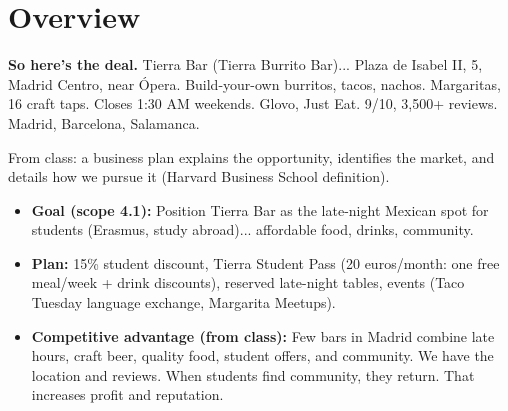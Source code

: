 \documentclass[11pt,a4paper]{article}
\begin{document}
\thispagestyle{empty}
\vspace*{2cm}
\noindent
{}
\vfill
{}
\newpage
\pagestyle{fancy}
\setcounter{page}{1}

\section{Overview}\label{sec:overview}

\textbf{So here's the deal.} Tierra Bar (Tierra Burrito Bar)... Plaza de Isabel II, 5, Madrid Centro, near \'Opera. Build-your-own burritos, tacos, nachos. Margaritas, 16 craft taps. Closes 1:30 AM weekends. Glovo, Just Eat. 9/10, 3,500+ reviews. Madrid, Barcelona, Salamanca.

From class: a business plan explains the opportunity, identifies the market, and details how we pursue it (Harvard Business School definition).

\begin{itemize}[leftmargin=*,nosep]
\item \textbf{Goal (scope 4.1):} Position Tierra Bar as the late-night Mexican spot for students (Erasmus, study abroad)... affordable food, drinks, community.
\item \textbf{Plan:} 15\% student discount, Tierra Student Pass (20 euros/month: one free meal/week + drink discounts), reserved late-night tables, events (Taco Tuesday language exchange, Margarita Meetups).
\item \textbf{Competitive advantage (from class):} Few bars in Madrid combine late hours, craft beer, quality food, student offers, and community. We have the location and reviews. When students find community, they return. That increases profit and reputation.
\end{itemize}
\end{document}
